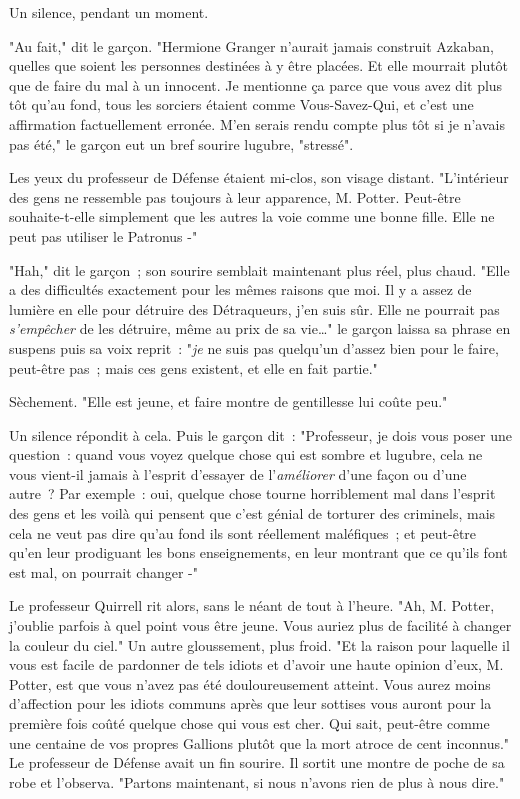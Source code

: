 Un silence, pendant un moment.

"Au fait," dit le garçon. "Hermione Granger n'aurait jamais construit Azkaban, quelles que soient les personnes destinées à y être placées. Et elle mourrait plutôt que de faire du mal à un innocent. Je mentionne ça parce que vous avez dit plus tôt qu'au fond, tous les sorciers étaient comme Vous-Savez-Qui, et c'est une affirmation factuellement erronée. M'en serais rendu compte plus tôt si je n'avais pas été," le garçon eut un bref sourire lugubre, "stressé".

Les yeux du professeur de Défense étaient mi-clos, son visage distant. "L'intérieur des gens ne ressemble pas toujours à leur apparence, M. Potter. Peut-être souhaite-t-elle simplement que les autres la voie comme une bonne fille. Elle ne peut pas utiliser le Patronus -"

"Hah," dit le garçon~; son sourire semblait maintenant plus réel, plus chaud. "Elle a des difficultés exactement pour les mêmes raisons que moi. Il y a assez de lumière en elle pour détruire des Détraqueurs, j'en suis sûr. Elle ne pourrait pas \emph{s'empêcher} de les détruire, même au prix de sa vie…" le garçon laissa sa phrase en suspens puis sa voix reprit~: "\emph{je} ne suis pas quelqu'un d'assez bien pour le faire, peut-être pas~; mais ces gens existent, et elle en fait partie."

Sèchement. "Elle est jeune, et faire montre de gentillesse lui coûte peu."

Un silence répondit à cela. Puis le garçon dit~: "Professeur, je dois vous poser une question~: quand vous voyez quelque chose qui est sombre et lugubre, cela ne vous vient-il jamais à l'esprit d'essayer de l'\emph{améliorer} d'une façon ou d'une autre~? Par exemple~: oui, quelque chose tourne horriblement mal dans l'esprit des gens et les voilà qui pensent que c'est génial de torturer des criminels, mais cela ne veut pas dire qu'au fond ils sont réellement maléfiques~; et peut-être qu'en leur prodiguant les bons enseignements, en leur montrant que ce qu'ils font est mal, on pourrait changer -"

Le professeur Quirrell rit alors, sans le néant de tout à l'heure. "Ah, M. Potter, j'oublie parfois à quel point vous être jeune. Vous auriez plus de facilité à changer la couleur du ciel." Un autre gloussement, plus froid. "Et la raison pour laquelle il vous est facile de pardonner de tels idiots et d'avoir une haute opinion d'eux, M. Potter, est que vous n'avez pas été douloureusement atteint. Vous aurez moins d'affection pour les idiots communs après que leur sottises vous auront pour la première fois coûté quelque chose qui vous est cher. Qui sait, peut-être comme une centaine de vos propres Gallions plutôt que la mort atroce de cent inconnus." Le professeur de Défense avait un fin sourire. Il sortit une montre de poche de sa robe et l'observa. "Partons maintenant, si nous n'avons rien de plus à nous dire."

